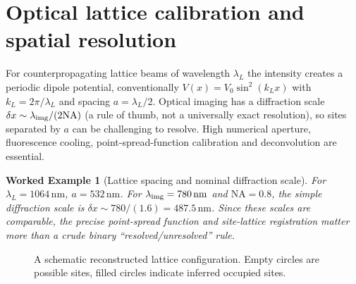 \documentclass[11pt,a4paper]{article}
\newtheorem{example}{Worked Example}
\begin{document}
\section{Optical lattice calibration and spatial resolution}
For counterpropagating lattice beams of wavelength $\lambda_L$ the intensity creates a periodic dipole potential, conventionally $V(x)=V_0\sin^2(k_Lx)$ with $k_L=2\pi/\lambda_L$ and spacing $a=\lambda_L/2$. Optical imaging has a diffraction scale $\delta x\sim\lambda_{\rm img}/(2\mathrm{NA})$ (a rule of thumb, not a universally exact resolution), so sites separated by $a$ can be challenging to resolve. High numerical aperture, fluorescence cooling, point-spread-function calibration and deconvolution are essential.
\begin{example}[Lattice spacing and nominal diffraction scale]
For $\lambda_L=1064\,\mathrm{nm}$, $a=532\,\mathrm{nm}$. For $\lambda_{\rm img}=780\,\mathrm{nm}$ and $\mathrm{NA}=0.8$, the simple diffraction scale is $\delta x\sim780/(1.6)=487.5\,\mathrm{nm}$. Since these scales are comparable, the precise point-spread function and site-lattice registration matter more than a crude binary ``resolved/unresolved'' rule.
\end{example}
\begin{figure}[ht]\centering{}\caption{A schematic reconstructed lattice configuration. Empty circles are possible sites, filled circles indicate inferred occupied sites.}\end{figure}
\end{document}

